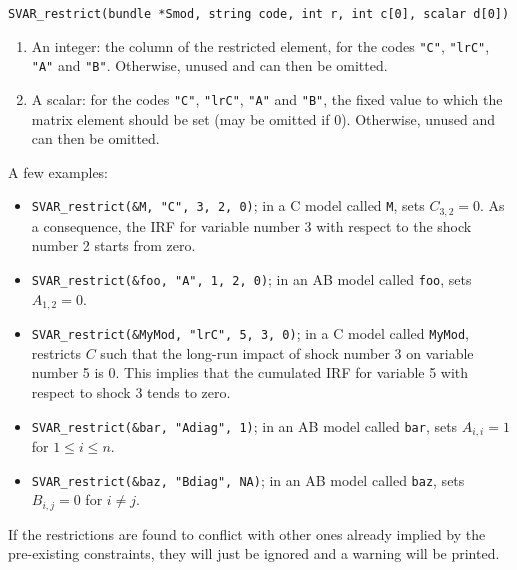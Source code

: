 \documentclass[a4paper,10pt]{article}
\newenvironment{funcdoc}[1]
{\noindent\hrulefill\newline\nopagebreak\texttt{#1}%
\nopagebreak\par\noindent\hrulefill%
\nopagebreak\par\nopagebreak\smallskip\nopagebreak\par}
{\bigskip}
\newcounter{script}[section]
\begin{document}
\begin{funcdoc}{SVAR\_restrict(bundle *Smod, string code, int r, int c[0], scalar d[0])}
\begin{enumerate}
\begin{description}
    \texttt{"Bdiag"}. The argument specifies what kind of restriction
    is to be placed on the diagonal: any valid scalar indicates that
    the diagonal of $A$ (or $B$) is set to that value. Almost
    invariably, this is used with the value 1. IMPORTANT: if this
    argument is \texttt{NA}, all \emph{non-diagonal} elements are
    constrained to 0, while diagonal elements are left unrestricted.
  \end{description}
\item An integer: the column of the restricted element, for the codes
  \texttt{"C"}, \texttt{"lrC"}, \texttt{"A"} and
  \texttt{"B"}. Otherwise, unused and can then be omitted.
\item A scalar: for the codes \texttt{"C"}, \texttt{"lrC"},
  \texttt{"A"} and \texttt{"B"}, the fixed value to which the matrix
  element should be set (may be omitted if 0). Otherwise, unused and
  can then be omitted.
\end{enumerate}

A few examples: 
\begin{itemize}
\item \texttt{SVAR\_restrict(\&M, "C", 3, 2, 0)}; in a C model called
  \texttt{M}, sets $C_{3,2} = 0$. As a consequence, the IRF for
  variable number 3 with respect to the shock number 2 starts from
  zero.
\item \texttt{SVAR\_restrict(\&foo, "A", 1, 2, 0)}; in an AB model called
  \texttt{foo}, sets $A_{1,2} = 0$.
\item \texttt{SVAR\_restrict(\&MyMod, "lrC", 5, 3, 0)}; in a C model
  called \texttt{MyMod}, restricts $C$ such that the long-run impact
  of shock number 3 on variable number 5 is 0. This implies that the
  cumulated IRF for variable 5 with respect to shock 3 tends to zero.
\item \texttt{SVAR\_restrict(\&bar, "Adiag", 1)}; in an AB model called
  \texttt{bar}, sets $A_{i,i} = 1$ for $1 \le i \le n$.
\item \texttt{SVAR\_restrict(\&baz, "Bdiag", NA)}; in an AB model called
  \texttt{baz}, sets $B_{i,j} = 0$ for $i \ne j$.
\end{itemize}

If the restrictions are found to conflict with other ones already
implied by the pre-existing constraints, they will just be ignored and
a warning will be printed.
\end{funcdoc}
\end{document}
